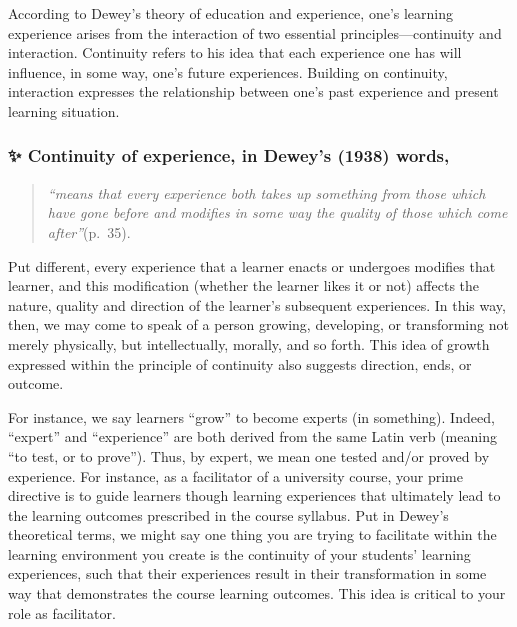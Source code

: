 \documentclass[
]{book}
\begin{document}
According to Dewey's theory of education and experience, one's learning experience arises from the interaction of two essential principles---continuity and interaction. Continuity refers to his idea that each experience one has will influence, in some way, one's future experiences. Building on continuity, interaction expresses the relationship between one's past experience and present learning situation.

\begin{blank}
\hypertarget{continuity-of-experience-in-deweys-1938-words}{%
\subsubsection{✨ Continuity of experience, in Dewey's (1938) words,}\label{continuity-of-experience-in-deweys-1938-words}}

\begin{quote}
\emph{``means that every experience both takes up something from those which have gone before and modifies in some way the quality of those which come after''}(p.~35).
\end{quote}
\end{blank}

Put different, every experience that a learner enacts or undergoes modifies that learner, and this modification (whether the learner likes it or not) affects the nature, quality and direction of the learner's subsequent experiences. In this way, then, we may come to speak of a person growing, developing, or transforming not merely physically, but intellectually, morally, and so forth. This idea of growth expressed within the principle of continuity also suggests direction, ends, or outcome.

For instance, we say learners ``grow'' to become experts (in something). Indeed, ``expert'' and ``experience'' are both derived from the same Latin verb (meaning ``to test, or to prove''). Thus, by expert, we mean one tested and/or proved by experience. For instance, as a facilitator of a university course, your prime directive is to guide learners though learning experiences that ultimately lead to the learning outcomes prescribed in the course syllabus. Put in Dewey's theoretical terms, we might say one thing you are trying to facilitate within the learning environment you create is the continuity of your students' learning experiences, such that their experiences result in their transformation in some way that demonstrates the course learning outcomes. This idea is critical to your role as facilitator.
\end{document}
